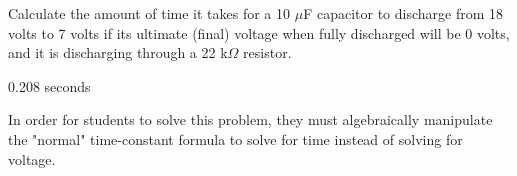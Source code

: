 

Calculate the amount of time it takes for a 10 $\mu$F capacitor to discharge from 18 volts to 7 volts if its ultimate (final) voltage when fully discharged will be 0 volts, and it is discharging through a 22 k$\Omega$ resistor.







0.208 seconds







In order for students to solve this problem, they must algebraically manipulate the "normal" time-constant formula to solve for time instead of solving for voltage.




